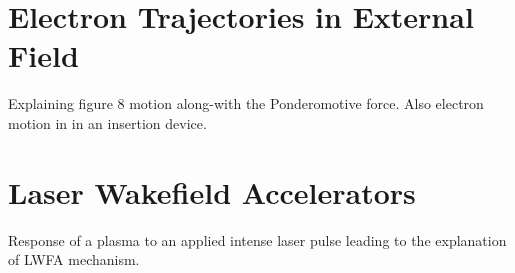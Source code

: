 




\section{Electron Trajectories in External Field}

Explaining figure 8 motion along-with the Ponderomotive force. Also electron motion in in an insertion device. 

\section{Laser Wakefield Accelerators}

Response of a plasma to an applied intense laser pulse leading to the explanation of LWFA mechanism.
